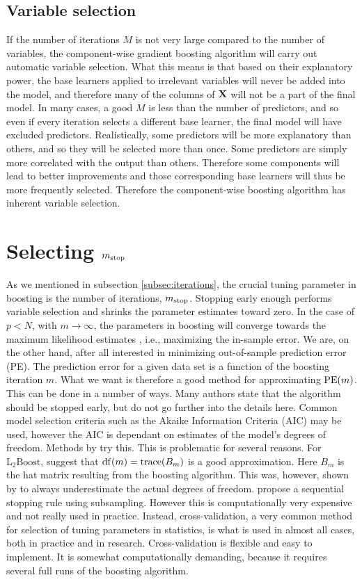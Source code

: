 \subsection{Variable selection}
If the number of iterations $M$ is not very large compared to the number of variables, the component-wise gradient boosting algorithm will carry out automatic variable selection. What this means is that based on their explanatory power, the base learners applied to irrelevant variables will never be added into the model, and therefore many of the columns of $\mathbf{X}$ will not be a part of the final model. In many cases, a good $M$ is less than the number of predictors, and so even if every iteration selects a different base learner, the final model will have excluded predictors. Realistically, some predictors will be more explanatory than others, and so they will be selected more than once. Some predictors are simply more correlated with the output than others. Therefore some components will lead to better improvements and those corresponding base learners will thus be more frequently selected. Therefore the component-wise boosting algorithm has inherent variable selection.

\section{Selecting $m_{\text{stop}}$}
As we mentioned in subsection \ref{subsec:iterations}, the crucial tuning parameter in boosting is the number of iterations, $m_{\text{stop}}$. Stopping early enough performs variable selection and shrinks the parameter estimates toward zero. In the case of $p<N$, with $m\to\infty$, the parameters in boosting will converge towards the maximum likelihood estimates \citep{DeBin2016}, i.e., maximizing the in-sample error. We are, on the other hand, after all interested in minimizing out-of-sample prediction error (PE). The prediction error for a given data set is a function of the boosting iteration $m$. What we want is therefore a good method for approximating $\operatorname{PE}(m)$. This can be done in a number of ways. Many authors state that the algorithm should be stopped early, but do not go further into the details here. Common model selection criteria such as the Akaike Information Criteria (AIC) may be used, however the AIC is dependant on estimates of the model's degrees of freedom. Methods by \citet{chang2010} try this. This is problematic for several reasons. For $\text{L}_2\text{Boost}$, \citet{buhlmann2007} suggest that $\operatorname{df}(m)=\operatorname{trace}(B_m)$ is a good approximation. Here $B_m$ is the hat matrix resulting from the boosting algorithm. This was, however, shown by \citet{hastie2007} to always underestimate the actual degrees of freedom. \citet{mayr-hofner} propose a sequential stopping rule using subsampling. However this is computationally very expensive and not really used in practice. Instead, cross-validation, a very common method for selection of tuning parameters in statistics, is what is used in almost all cases, both in practice and in research. Cross-validation is flexible and easy to implement. It is somewhat computationally demanding, because it requires several full runs of the boosting algorithm.

